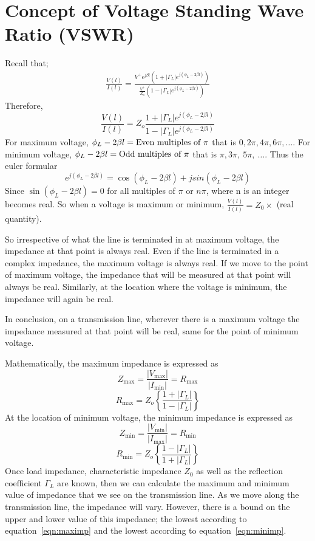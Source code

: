 \section{Concept of Voltage Standing Wave Ratio (VSWR)}
Recall that;
\begin{align*}
\frac{V(l)}{I(l)} = \frac{V^{+}e^{j\beta l}(1+ |\Gamma_L|e^{j(\phi_L- 2 \beta l)})}{\frac{V^{+}}{Z_o}(1- |\Gamma_L|e^{j(\phi_L- 2\beta l)})}
\end{align*}
Therefore,
\begin{equation*}
\frac{V(l)}{I(l)} = Z_o \frac{1+ |\Gamma_L|e^{j(\phi_L- 2 \beta l)}}{1- |\Gamma_L|e^{j(\phi_L- 2\beta l)}}
\end{equation*}
For maximum voltage, $\phi_L-2\beta l = \textnormal{Even multiples of }\pi$ that is $0, 2\pi, 4\pi,  6\pi,\ldots$. For minimum voltage,  $\phi_L-2\beta l=\textnormal{Odd multiples of } \pi$ that is $\pi, 3\pi,\ 5\pi,\ \ldots$. Thus the euler formular 
\[e^{j(\phi_L - 2 \beta l)} = \cos(\phi_L - 2 \beta l) + jsin(\phi_L - 2 \beta l)\]
Since $\sin(\phi_L - 2 \beta l) = 0$ for all multiples of $\pi$ or $n\pi$, where n is an integer becomes real. So when a voltage is maximum or minimum, $\frac{V(l)}{I(l)} = Z_0 \times$ (real quantity).

So irrespective of what the line is terminated in at maximum voltage, the impedance at that point is always real. Even if the line is terminated in a complex impedance, the maximum voltage is always real. If we move to the point of maximum voltage, the impedance that will be measured at that point will always be real. Similarly, at the location where the voltage is minimum, the impedance will again be real.

In conclusion, on a transmission line, wherever there is a maximum voltage the impedance measured at that point will be real, same for the point of minimum voltage.

Mathematically, the maximum impedance is expressed as
\begin{equation}
Z_{\max} = \frac{|V_{\max}|}{|I_{\min}|} = R_{\max}
\label{eqn:maximp}
\end{equation}
\begin{equation}
R_{\max}= Z_o\left\{\frac{1+|\Gamma_L|}{1-|\Gamma_L|}\right\}
\end{equation}
At the location of minimum voltage, the minimum impedance is expressed as
\begin{equation}
Z_{\min}=\frac{|V_{\min}|}{|I_{\max}|} = R_{\min}
\label{eqn:minimp}
\end{equation}
\begin{equation}
R_{\min} =Z_o\left\{\frac{1-|\Gamma_L|}{1+|\Gamma_L|}\right\}
\end{equation}
Once load impedance, characteristic impedance $Z_0$ as well as the reflection coefficient $\Gamma_L$ are known, then we can calculate the maximum and minimum value of impedance that we see on the transmission line. As we move along the transmission line, the impedance will vary. However, there is a bound on the upper and lower value of this impedance; the lowest according to equation~\ref{eqn:maximp} and the lowest according to equation~\ref{eqn:minimp}.

